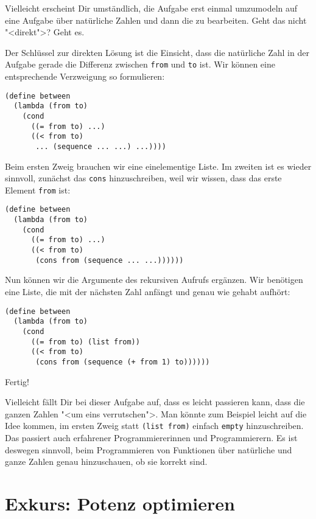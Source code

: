 Vielleicht erscheint Dir umständlich, die Aufgabe erst einmal
umzumodeln auf eine Aufgabe über natürliche Zahlen und dann die zu
bearbeiten.  Geht das nicht "<direkt">? Geht es.

Der Schlüssel zur direkten Lösung ist die Einsicht, dass die
natürliche Zahl in der Aufgabe gerade die Differenz zwischen
\lstinline{from} und \lstinline{to} ist.  Wir können eine
entsprechende Verzweigung so formulieren:
%
\begin{lstlisting}
(define between
  (lambda (from to)
    (cond
      ((= from to) ...)
      ((< from to)
       ... (sequence ... ...) ...))))
\end{lstlisting}
%
Beim ersten Zweig brauchen wir eine einelementige Liste.  Im zweiten
ist es wieder sinnvoll, zunächst das \lstinline{cons} hinzuschreiben,
weil wir wissen, dass das erste Element \lstinline{from} ist:
%
\begin{lstlisting}
(define between
  (lambda (from to)
    (cond
      ((= from to) ...)
      ((< from to)
       (cons from (sequence ... ...))))))
\end{lstlisting}
%
Nun können wir die Argumente des rekursiven Aufrufs ergänzen.  Wir
benötigen eine Liste, die mit der nächsten Zahl anfängt und genau wie
gehabt aufhört:
%
\begin{lstlisting}
(define between
  (lambda (from to)
    (cond
      ((= from to) (list from))
      ((< from to)
       (cons from (sequence (+ from 1) to))))))
\end{lstlisting}
%
Fertig!

Vielleicht fällt Dir bei dieser Aufgabe auf, dass es leicht passieren
kann, dass die ganzen Zahlen "<um eins verrutschen">.  Man könnte zum
Beispiel leicht auf die Idee kommen, im ersten Zweig statt
\lstinline{(list from)} einfach \lstinline{empty} hinzuschreiben.  Das
passiert auch erfahrener Programmiererinnen und Programmierern.  Es
ist deswegen sinnvoll, beim Programmieren von Funktionen über
natürliche und ganze Zahlen genau hinzuschauen, ob sie korrekt sind.

\section{Exkurs: Potenz optimieren}

